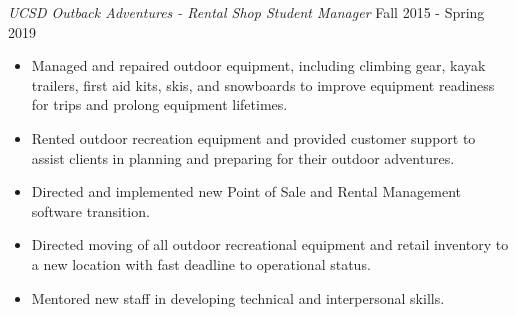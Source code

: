 \documentclass[line,margin]{res}
\begin{document}
\begin{resume}
	{\sl UCSD Outback Adventures - Rental Shop Student Manager} \hfill Fall 2015 - Spring 2019
	\begin{itemize}
		\item Managed and repaired outdoor equipment, including climbing gear, kayak trailers, first aid kits, skis, and snowboards to improve equipment readiness for trips and prolong equipment lifetimes.
		\item Rented outdoor recreation equipment and provided customer support to assist clients in planning and preparing for their outdoor adventures.
		\item Directed and implemented new Point of Sale and Rental Management software transition.
		\item Directed moving of all outdoor recreational equipment and retail inventory to a new location with fast deadline to operational status.
		\item Mentored new staff in developing technical and interpersonal skills.
	\end{itemize}


\end{resume}
\end{document}
